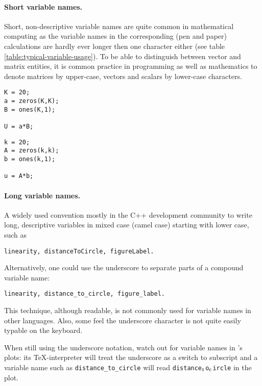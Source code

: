 \paragraph{Short variable names.}
Short, non-descriptive variable names are quite common in mathematical computing as the variable names in the corresponding (pen and paper) calculations are hardly ever longer then one character either (see table \ref{table:typical-variable-usage}). To be able to distinguish between vector and matrix entities, it is common practice in programming as well as mathematics to denote matrices by upper-case, vectors and scalars by lower-case characters.

\hfill
\begin{minipage}[t]{.45\textwidth}
\begin{lstlisting}[framerule=2pt,rulecolor=\color{badred}]
K = 20;
a = zeros(K,K);
B = ones(K,1);

U = a*B;
\end{lstlisting}
\end{minipage}
\hfill
\begin{minipage}[t]{.45\textwidth}
\begin{lstlisting}[framerule=2pt,rulecolor=\color{goodgreen}]
k = 20;
A = zeros(k,k);
b = ones(k,1);

u = A*b;
\end{lstlisting}
\end{minipage}
\hfill


\paragraph{Long variable names.}
A widely used convention mostly in the C++ development community to write long, descriptive variables in mixed case (camel case) starting with lower case, such as
\begin{lstlisting}
linearity, distanceToCircle, figureLabel.
\end{lstlisting}
Alternatively, one could use the underscore to separate parts of a compound variable name:
\begin{lstlisting}
linearity, distance_to_circle, figure_label.
\end{lstlisting}
This technique, although readable, is not commonly used for variable names in other languages. Also, some feel the underscore character is not quite easily typable on the keyboard.

When still using the underscore notation, watch out for variable names in \matlab{}'s plots: its \TeX-interpreter will treat the underscore as a switch to subscript and a variable name such as \lstinline!distance_to_circle! will read \lstinline!distance!$_{\text{\lstinline!t!}}$\lstinline!o!$_{\text{\lstinline!c!}}$\lstinline!ircle! in the plot.

